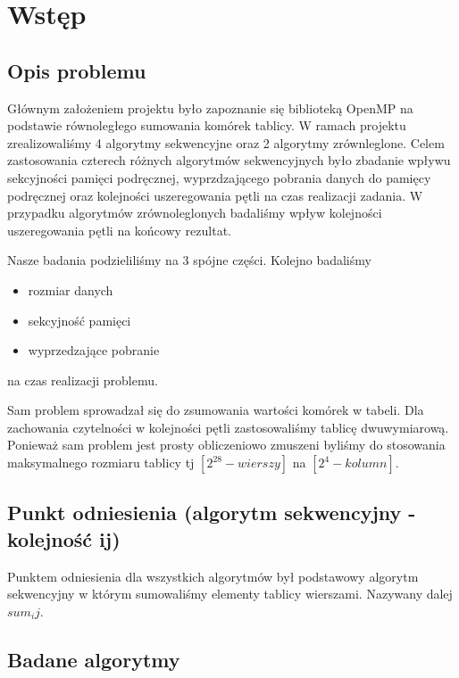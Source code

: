 \section{Wstęp}

\subsection{Opis problemu}

Głównym założeniem projektu było zapoznanie się biblioteką OpenMP na podstawie równoległego sumowania komórek tablicy. W ramach projektu zrealizowaliśmy 4 algorytmy sekwencyjne oraz 2 algorytmy zrównleglone. Celem zastosowania czterech różnych algorytmów sekwencyjnych było zbadanie wpływu sekcyjności pamięci podręcznej, wyprzdzającego pobrania danych do pamięcy podręcznej oraz kolejności uszeregowania pętli na czas realizacji zadania. W przypadku algorytmów zrównoleglonych badaliśmy wpływ kolejności uszeregowania pętli na końcowy rezultat.\newline

Nasze badania podzieliliśmy na 3 spójne części. Kolejno badaliśmy
\begin{itemize}
\item rozmiar danych
\item sekcyjność pamięci
\item wyprzedzające pobranie
\end{itemize}
na czas realizacji problemu.\newline

Sam problem sprowadzał się do zsumowania wartości komórek w tabeli. Dla zachowania czytelności w kolejności pętli zastosowaliśmy tablicę dwuwymiarową. Ponieważ sam problem jest prosty obliczeniowo zmuszeni byliśmy do stosowania maksymalnego rozmiaru tablicy tj $[2^{28} - wierszy]$ na $[2^{4} - kolumn]$.

\subsection{Punkt odniesienia (algorytm sekwencyjny - kolejność ij)}

Punktem odniesienia dla wszystkich algorytmów był podstawowy algorytm sekwencyjny w którym sumowaliśmy elementy tablicy wierszami. Nazywany dalej $sum_ij$.




\subsection{Badane algorytmy}


